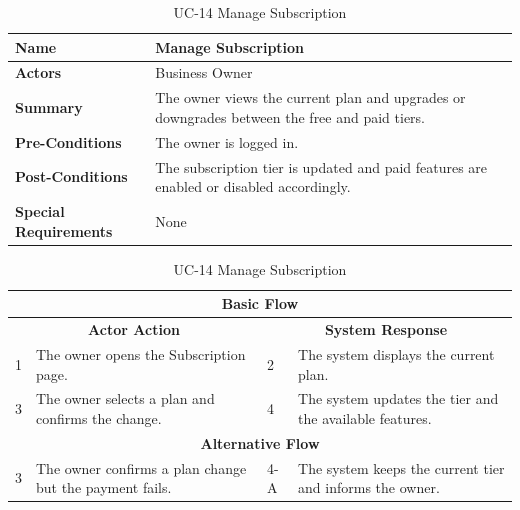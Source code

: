 \documentclass{StockSense}
\begin{document}
\begin{table}[!htbp]
\centering
\caption{UC-14 Manage Subscription}
{\small\linespread{1}\selectfont
\begin{tabular}{|p{}|p{}|}
\hline
\textbf{Name} & Manage Subscription \\ \hline
\textbf{Actors} & Business Owner \\ \hline
\textbf{Summary} & The owner views the current plan and upgrades or downgrades between the free and paid tiers. \\ \hline
\textbf{Pre-Conditions} & The owner is logged in. \\ \hline
\textbf{Post-Conditions} & The subscription tier is updated and paid features are enabled or disabled accordingly. \\ \hline
\textbf{Special Requirements} & None \\ \hline
\end{tabular}\par\nointerlineskip
\begin{tabular}{|p{}|p{}|p{}|p{}|}
\multicolumn{4}{|c|}{\textbf{Basic Flow}} \\ \hline
\multicolumn{2}{|c|}{\textbf{Actor Action}} & \multicolumn{2}{c|}{\textbf{System Response}} \\ \hline
1 & The owner opens the Subscription page. & 2 & The system displays the current plan. \\ \hline
3 & The owner selects a plan and confirms the change. & 4 & The system updates the tier and the available features. \\ \hline
\multicolumn{4}{|c|}{\textbf{Alternative Flow}} \\ \hline
3 & The owner confirms a plan change but the payment fails. & 4-A & The system keeps the current tier and informs the owner. \\ \hline
\end{tabular}\par}
\end{table}
\end{document}
